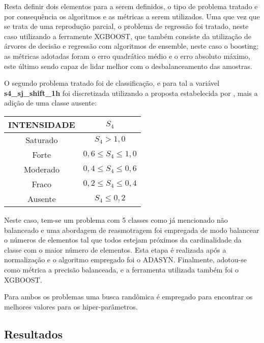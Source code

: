 Resta definir dois elementos para a serem definidos, o tipo de problema tratado e por consequência os algoritmos e as métricas a serem utilizados. Uma que vez que se trata de uma reprodução parcial, o problema de regressão foi tratado, neste caso utilizando a ferramente XGBOOST, que também consiste da utilização de árvores de decisão e regressão com algoritmos de ensemble, neste caso o boosting; as métricas adotadas foram o erro quadrático médio e o erro absoluto máximo, este último sendo capaz de lidar melhor com o desbalanceamento das amostras. 

O segundo problema tratado foi de classificação, e para tal a variável {\bf s4\_sj\_shift\_1h} foi discretizada utilizando a proposta estabelecida por \cite{MUELLA:2008}, mais a adição de uma classe ausente:

\begin{table}
\begin{center}
\begin{tabular}{|c|c|}
\hline
{\bf INTENSIDADE} & {\bf $S_4$} \\ \hline
Saturado          & $S_4 > 1,0$ \\ \hline
Forte             & $0,6 \le S_4 \le 1,0$ \\ \hline
Moderado          & $0,4 \le S_4 \le 0,6$ \\ \hline
Fraco             & $0,2 \le S_4 \le 0,4$ \\ \hline
Ausente           & $ S_4 \le 0,2 $ \\ \hline
\end{tabular}
\end{center}
\end{table}

Neste caso, tem-se um problema com 5 classes como já mencionado não balanceado e uma abordagem de reasmotragem foi empregada de modo balancear o números de elementos tal que todos estejam próximos da cardinalidade da classe com o maior número de elementos. Esta etapa é realizada após a normalização e o algoritmo empregado foi o ADASYN. Finalmente, adotou-se como métrica a precisão balanceada, e a ferramenta utilizada também foi o XGBOOST.

Para ambos os problemas uma busca randômica é empregado para encontrar os melhores valores para os hiper-parâmetros.

\subsection{Resultados}

